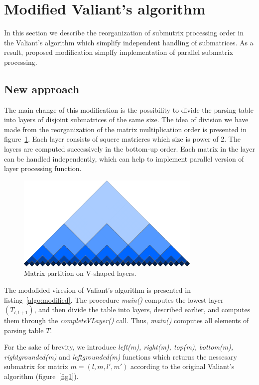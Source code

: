 \section{Modified Valiant's algorithm}

In this section we describe the reorganization of submutrix processing order in the Valiant's algorithm which simplify independent handling of submatrices. As a result, proposed modification simplfy implementation of parallel submatrix processing.

\subsection{New approach}

The main change of this modification is the possibility to divide the parsing table into layers of disjoint submatrices of the same size.
The idea of division we have made from the reorganization of the matrix multiplication order is presented in figure~\ref{fig2}.
Each layer consists of squere matricres which size is power of 2.
The layers are computed successively in the bottom-up order.
Each matrix in the layer can be handled independently, which can help to implement parallel version of layer processing function.

\begin{figure}
\includegraphics[width=250pt]{layers2.eps}
\centering
\caption{Matrix partition on V-shaped layers.}
\label{fig2}
\end{figure}

The modofided viresion of Valiant's algorithm is presented in listing~\ref{algo:modified}.
The procedure \textit{main()} computes the lowest layer $(T_{l, l+1})$, and then divide the table into layers, described earlier, and computes them through the \textit{completeVLayer()} call.
Thus, \textit{main()} computes all elements of parsing table $T$.

For the sake of brevity, we introduce \textit{left(m), right(m), top(m), bottom(m), rightgrounded(m)} and \textit{leftgrounded(m)} functions which returns the nessesary submatrix for matrix $m = (l, m, l', m')$ according to the original Valiant's algorithm (figure~\ref{fig1}).

